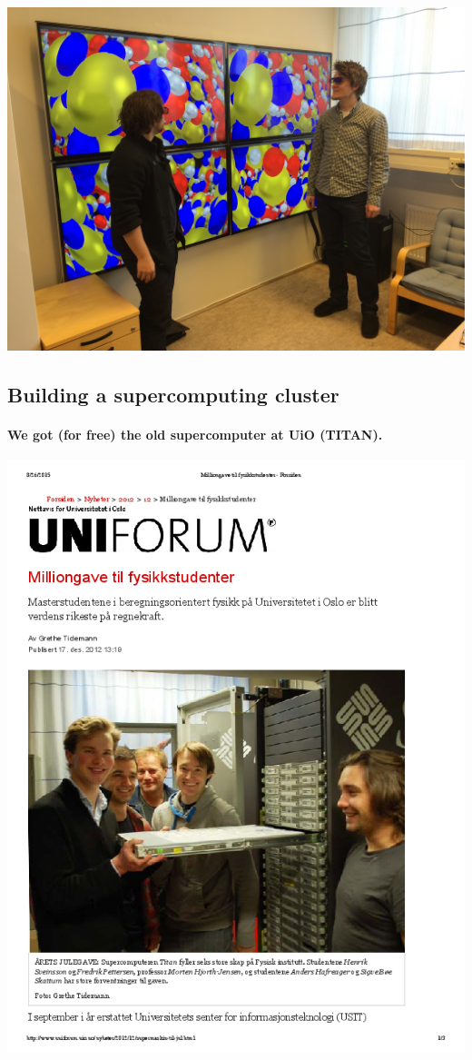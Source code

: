 \documentclass[%
oneside,                 %
final,                   %
10pt]{article}
\begin{document}
\centerline{\includegraphics[width=0.7\linewidth]{fig-future/visualize.jpg}}




\subsection*{Building a supercomputing cluster}

\paragraph{We got (for free) the old supercomputer at UiO (TITAN).}


\centerline{\includegraphics[width=0.7\linewidth]{fig-future/uniforum-0.png}}
\end{document}
